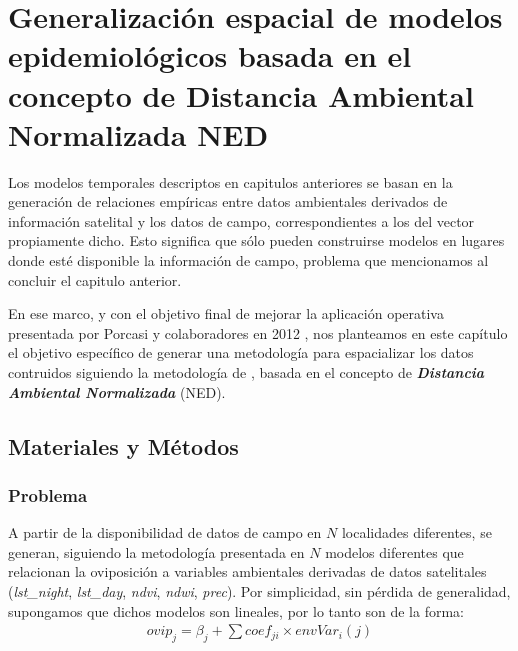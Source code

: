 \justifying

\chapter{Generalización espacial de modelos epidemiológicos basada en el
        concepto de Distancia Ambiental Normalizada NED}

  \par Los modelos temporales descriptos en capitulos anteriores se basan en la
    generación de relaciones empíricas entre datos ambientales derivados de
    información satelital y los datos de campo, correspondientes a los del vector
    propiamente dicho. Esto significa que sólo pueden construirse modelos en
    lugares donde esté disponible la información de campo, problema que mencionamos
    al concluir el capitulo anterior.

  \par En ese marco, y con el objetivo final de mejorar la aplicación operativa
    presentada por Porcasi y colaboradores en 2012 \cite{porcasi_operative},
    nos planteamos en este capítulo el objetivo específico de generar
    una metodología para espacializar los datos contruidos siguiendo la
    metodología de \cite{german_temporal}, basada en el concepto de
    \textbf{\textit{Distancia Ambiental Normalizada}} (NED).


\section{Materiales y Métodos}

\subsection{Problema}

  \par A partir de la disponibilidad de datos de campo en $N$ localidades
    diferentes, se generan, siguiendo la metodología presentada en \cite{german_temporal}
    $N$ modelos diferentes que relacionan la oviposición a variables ambientales
    derivadas de datos satelitales (\textit{lst\_night}, \textit{lst\_day},
    \textit{ndvi}, \textit{ndwi}, \textit{prec}). Por simplicidad, sin pérdida
    de generalidad, supongamos que dichos modelos son lineales, por lo tanto
    son de la forma:
    \begin{align}
      ovip_{j} = \beta_{j} + \sum{}{coef_{ji} \times envVar_{i}(j)}
    \end{align}

